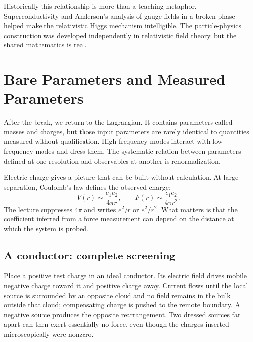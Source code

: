 \begin{classroomqa}
\end{classroomqa}

Historically this relationship is more than a teaching metaphor.
Superconductivity and Anderson's analysis of gauge fields in a broken
phase helped make the relativistic Higgs mechanism intelligible. The
particle-physics construction was developed independently in relativistic
field theory, but the shared mathematics is real.

\section{Bare Parameters and Measured Parameters}

After the break, we return to the Lagrangian. It contains
parameters called masses and charges, but those input parameters are rarely
identical to quantities measured without qualification. High-frequency
modes interact with low-frequency modes and dress them. The systematic
relation between parameters defined at one resolution and observables at
another is renormalization.

Electric charge gives a picture that can be built without calculation.
At large separation, Coulomb's law defines the observed charge:
\begin{equation}
  V(r)\sim\frac{e_1e_2}{4\pi r},
  \qquad
  F(r)\sim\frac{e_1e_2}{4\pi r^2}.
  \label{eq:l10-coulomb-law}
\end{equation}
The lecture suppresses \(4\pi\) and writes \(e^2/r\) or \(e^2/r^2\).
What matters is that the coefficient inferred from a force measurement can
depend on the distance at which the system is probed.

\subsection{A conductor: complete screening}

Place a positive test charge in an ideal conductor. Its electric field
drives mobile negative charge toward it and positive charge away. Current
flows until the local source is surrounded by an opposite cloud and no
field remains in the bulk outside that cloud; compensating charge is pushed
to the remote boundary. A negative source produces the opposite
rearrangement. Two dressed sources far apart can then exert essentially no
force, even though the charges inserted microscopically were nonzero.

